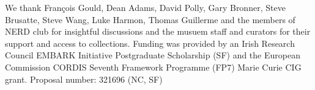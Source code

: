 \documentclass[12pt,a4paper]{article}
\begin{document}
	We thank Fran\c{c}ois Gould, Dean Adams, David Polly, Gary Bronner, Steve Brusatte, Steve Wang, Luke Harmon, Thomas Guillerme and the members of NERD club for insightful discussions and the musuem staff and curators for their support and access to collections. Funding was provided by an Irish Research Council EMBARK Initiative Postgraduate Scholarship (SF) and the European Commission CORDIS Seventh Framework Programme (FP7) Marie Curie CIG grant. Proposal number: 321696 (NC, SF)






\end{document}
